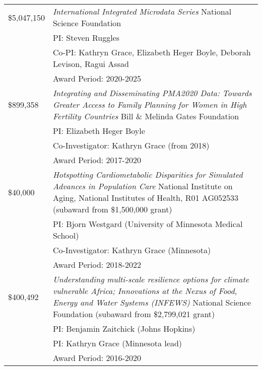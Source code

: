 \documentclass[11pt]{article} %
\begin{document}
\begin{tabular}{lp{11cm}}
\$5,047,150 & \emph{International Integrated Microdata Series} National Science Foundation\\
&PI: Steven Ruggles\\
&Co-PI: Kathryn Grace, Elizabeth Heger Boyle, Deborah Levison, Ragui Assad\\
&Award Period: 2020-2025\\



\$899,358 & \emph{Integrating and Disseminating PMA2020 Data: Towards Greater Access to Family Planning for Women in High Fertility Countries} Bill \& Melinda Gates Foundation\\
&PI: Elizabeth Heger Boyle\\
&Co-Investigator: Kathryn Grace (from 2018)\\
&Award Period: 2017-2020 \\





\$40,000& \emph{Hotspotting Cardiometabolic Disparities for Simulated Advances in Population Care} National Institute on Aging, National Institutes of Health, R01 AG052533 (subaward from \$1,500,000 grant)\\
&PI: Bjorn Westgard (University of Minnesota Medical School)\\
&Co-Investigator: Kathryn Grace (Minnesota)\\
&Award Period: 2018-2022\\



\$400,492& \emph{Understanding multi-scale resilience options for climate vulnerable Africa; Innovations at the Nexus of Food, Energy and Water Systems (INFEWS)} National Science Foundation (subaward from \$2,799,021 grant)\\
&PI: Benjamin Zaitchick (Johns Hopkins)\\
&PI: Kathryn Grace (Minnesota lead)\\
&Award Period: 2016-2020\\

\end{tabular}
\end{document}
